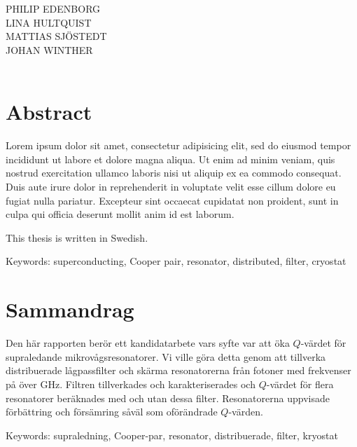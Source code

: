 \documentclass[../../main.tex]{subfiles}
\begin{document}
\titel\\
\undertitel\\
PHILIP EDENBORG\\LINA HULTQUIST\\MATTIAS SJÖSTEDT\\JOHAN WINTHER\\
\department\\
\university \setlength{\parskip}{0.5cm}

\thispagestyle{plain}			%
\setlength{\parskip}{0pt plus 1.0pt}
\section*{Abstract}
Lorem ipsum dolor sit amet, consectetur adipisicing elit, sed do eiusmod tempor incididunt ut labore et dolore magna aliqua. Ut enim ad minim veniam, quis nostrud exercitation ullamco laboris nisi ut aliquip ex ea commodo consequat. Duis aute irure dolor in reprehenderit in voluptate velit esse cillum dolore eu fugiat nulla pariatur. Excepteur sint occaecat cupidatat non proident, sunt in culpa qui officia deserunt mollit anim id est laborum.

This thesis is written in Swedish.

\vfill
Keywords: superconducting, Cooper pair, resonator, distributed, filter, cryostat

\section*{Sammandrag}
Den här rapporten berör ett kandidatarbete vars syfte var att öka $Q$-värdet för supraledande mikrovågsresonatorer. Vi ville göra detta genom att tillverka distribuerade lågpassfilter och skärma resonatorerna från fotoner med frekvenser på över \unit[88]{GHz}. Filtren tillverkades och karakteriserades och $Q$-värdet för flera resonatorer beräknades med och utan dessa filter. Resonatorerna uppvisade förbättring och försämring såväl som oförändrade $Q$-värden.

\vfill
Keywords: supraledning, Cooper-par, resonator, distribuerade, filter, kryostat

\newpage\null\thispagestyle{empty}\newpage
\end{document}

